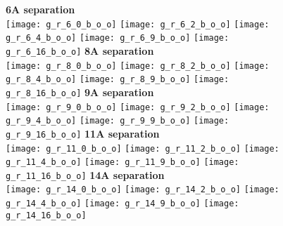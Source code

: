 \documentclass[journal=acsnano,manuscript=article]{achemso}
\begin{document}
\begin{figure}[h!]
	\centering
	\textbf{6A separation} \\
	\texttt{[image: g\_r\_6\_0\_b\_o\_o]} 
	\texttt{[image: g\_r\_6\_2\_b\_o\_o]}
	\texttt{[image: g\_r\_6\_4\_b\_o\_o]}
	\texttt{[image: g\_r\_6\_9\_b\_o\_o]}
	\texttt{[image: g\_r\_6\_16\_b\_o\_o]}
	\textbf{8A separation} \\
	\texttt{[image: g\_r\_8\_0\_b\_o\_o]} 
	\texttt{[image: g\_r\_8\_2\_b\_o\_o]}
	\texttt{[image: g\_r\_8\_4\_b\_o\_o]}
	\texttt{[image: g\_r\_8\_9\_b\_o\_o]}
	\texttt{[image: g\_r\_8\_16\_b\_o\_o]}
	\textbf{9A separation} \\
	\texttt{[image: g\_r\_9\_0\_b\_o\_o]} 
	\texttt{[image: g\_r\_9\_2\_b\_o\_o]}
	\texttt{[image: g\_r\_9\_4\_b\_o\_o]}
	\texttt{[image: g\_r\_9\_9\_b\_o\_o]}
	\texttt{[image: g\_r\_9\_16\_b\_o\_o]}
	\textbf{11A separation} \\
	\texttt{[image: g\_r\_11\_0\_b\_o\_o]} 
	\texttt{[image: g\_r\_11\_2\_b\_o\_o]}
	\texttt{[image: g\_r\_11\_4\_b\_o\_o]}
	\texttt{[image: g\_r\_11\_9\_b\_o\_o]}
	\texttt{[image: g\_r\_11\_16\_b\_o\_o]}
	\textbf{14A separation} \\
	\texttt{[image: g\_r\_14\_0\_b\_o\_o]} 
	\texttt{[image: g\_r\_14\_2\_b\_o\_o]}
	\texttt{[image: g\_r\_14\_4\_b\_o\_o]}
	\texttt{[image: g\_r\_14\_9\_b\_o\_o]}
	\texttt{[image: g\_r\_14\_16\_b\_o\_o]}
	\label{fig:gr}
\end{figure}
\end{document}
